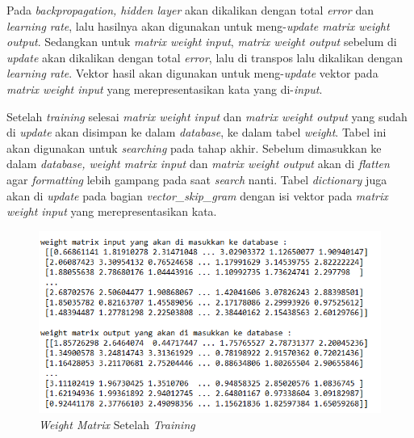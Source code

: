 \documentclass[12pt]{report}
\begin{document}
Pada \textit{backpropagation, hidden layer} akan dikalikan dengan total \textit{error} dan \textit{learning rate}, lalu hasilnya akan digunakan untuk meng-\textit{update matrix weight output}. Sedangkan untuk \textit{matrix weight input}, \textit{matrix weight output} sebelum di \textit{update} akan dikalikan dengan total \textit{error}, lalu di transpos lalu dikalikan dengan \textit{learning rate}. Vektor hasil akan digunakan untuk meng-\textit{update} vektor pada \textit{matrix weight input} yang merepresentasikan kata yang di-\textit{input}. 

Setelah \textit{training} selesai \textit{matrix weight input} dan \textit{matrix weight output} yang sudah di \textit{update} akan disimpan ke dalam \textit{database}, ke dalam tabel \textit{weight}. Tabel ini akan digunakan untuk \textit{searching} pada tahap akhir. Sebelum dimasukkan ke dalam \textit{database, weight matrix input} dan \textit{matrix weight output} akan di \textit{flatten} agar \textit{formatting} lebih gampang pada saat \textit{search} nanti. Tabel \textit{dictionary} juga akan di \textit{update} pada bagian \textit{vector\_skip\_gram} dengan isi vektor pada \textit{matrix weight input} yang merepresentasikan kata.

\begin{figure}[H]
\centering
\includegraphics[scale=0.75]{weight_matrix yang_sudah_di_update}
\caption{\textit{Weight Matrix} Setelah \textit{Training}}
\label{weightmatrixyangsudahdiupdate}
\end{figure}
\end{document}
